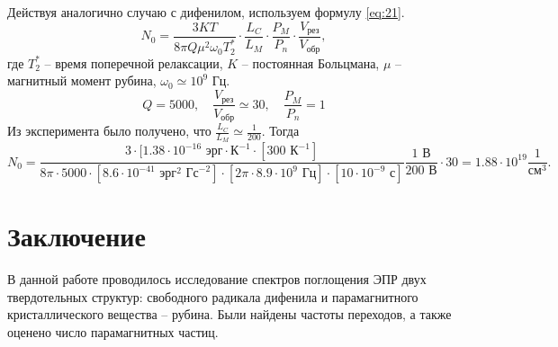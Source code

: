 Действуя аналогично случаю с дифенилом, используем формулу \eqref{eq:21}.
\begin{equation}
    \label{eq:21b}
    N_0 = \frac{3KT}{8 \pi Q \mu^2 \omega_0 T^*_2} \cdot \frac{L_C}{L_M} \cdot \frac{P_M}{P_n} \cdot \frac{V_{\text{рез}}}{V_{\text{обр}}},
\end{equation}
где $T_2^*$ -- время поперечной релаксации,  $K$ -- постоянная Больцмана,  $\mu$ -- магнитный момент рубина,
$\omega_0 \simeq 10^9$ Гц.
\begin{equation}
    \label{eq:}
    Q = 5000, \quad \frac{V_{\text{рез}}}{V_{\text{обр}}} \simeq 30, \quad \frac{P_M}{P_n} = 1
\end{equation}
Из эксперимента было получено, что $\frac{L_C}{L_M} \simeq \frac{1}{200}$. Тогда
\begin{equation}
    N_0 =  \frac{3\cdot[1.38 \cdot 10^{-16} \text{ эрг}\cdot\text{К}^{-1}
    \cdot [300 \text{ К}^{-1}]}{8\pi \cdot 5000\cdot[8.6\cdot 10^{-41} \text{ эрг}^2 \text{ Гс}^{-2}]
\cdot [2\pi \cdot 8.9 \cdot 10^9 \text{ Гц}] \cdot [10\cdot 10^{-9} \text{ с}] }
\frac{1 \text{ В}}{200 \text{ В}} \cdot 30  = 1.88 \cdot 10^{19} \frac{1}{\text{см}^3}.
\end{equation}

\section*{Заключение}%
В данной работе проводилось исследование спектров поглощения ЭПР двух твердотельных структур:
свободного радикала дифенила и парамагнитного кристаллического вещества -- рубина. Были найдены частоты переходов, а также оценено число парамагнитных частиц. 


